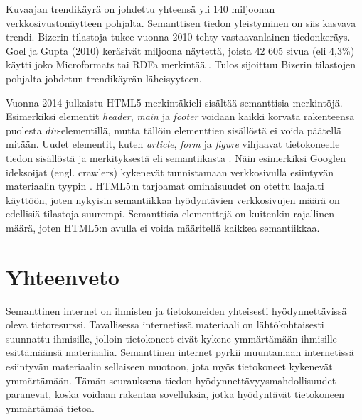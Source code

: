 \documentclass[finnish, 12pt, a4paper, elec, utf8, pdfa, online]{aaltothesis}
\begin{document}
{Kuvaajan trendikäyrä on johdettu yhteensä yli 140 miljoonan verkkosivustonäytteen pohjalta. Semanttisen tiedon yleistyminen on siis kasvava trendi. Bizerin tilastoja tukee vuonna 2010 tehty vastaavanlainen tiedonkeräys. Goel ja Gupta (2010) keräsivät miljoona näytettä, joista 42 605 sivua (eli 4,3\%) käytti joko Microformats tai RDFa merkintää \cite{Google}. Tulos sijoittuu Bizerin tilastojen pohjalta johdetun trendikäyrän läheisyyteen.

Vuonna 2014 julkaistu HTML5-merkintäkieli sisältää semanttisia merkintöjä. Esimerkiksi elementit \textit{header}, \textit{main} ja \textit{footer} voidaan kaikki korvata rakenteensa puolesta \textit{div}-elementillä, mutta tällöin elementtien sisällöstä ei voida päätellä mitään. Uudet elementit, kuten \textit{article}, \textit{form} ja \textit{figure} vihjaavat tietokoneelle tiedon sisällöstä ja merkityksestä eli semantiikasta \cite{html5}. Näin esimerkiksi Googlen ideksoijat (engl. crawlers) kykenevät tunnistamaan verkkosivulla esiintyvän materiaalin tyypin \cite{html5}. HTML5:n tarjoamat ominaisuudet on otettu laajalti käyttöön, joten nykyisin semantiikkaa hyödyntävien verkkosivujen määrä on edellisiä tilastoja suurempi. Semanttisia elementtejä on kuitenkin rajallinen määrä, joten HTML5:n avulla ei voida määritellä kaikkea semantiikkaa.

\clearpage %


\section{Yhteenveto}


Semanttinen internet on ihmisten ja tietokoneiden yhteisesti hyödynnettävissä oleva tietoresurssi. Tavallisessa internetissä materiaali on lähtökohtaisesti suunnattu ihmisille, jolloin tietokoneet eivät kykene ymmärtämään ihmisille esittämäänsä materiaalia. Semanttinen internet pyrkii muuntamaan internetissä esiintyvän materiaalin sellaiseen muotoon, jota myös tietokoneet kykenevät ymmärtämään. Tämän seurauksena tiedon hyödynnettävyysmahdollisuudet paranevat, koska voidaan rakentaa sovelluksia, jotka hyödyntävät tietokoneen ymmärtämää tietoa.

}
\end{document}
